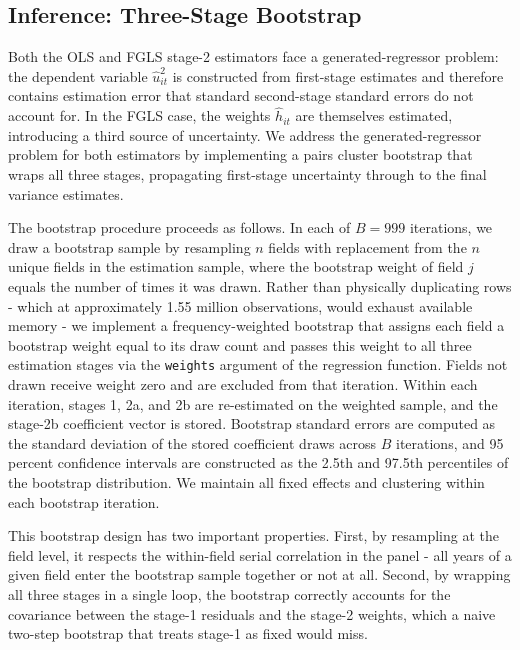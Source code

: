 \documentclass[12pt,letterpaper]{article}
\theoremstyle{remark}
\theoremstyle{remark}
\theoremstyle{plain}
\theoremstyle{definition}
\begin{document}
\subsection{\label{subsec:bootstrap}Inference: Three-Stage Bootstrap}

Both the OLS and FGLS stage-2 estimators face a generated-regressor problem: the dependent variable $\hat{u}_{it}^2$ is constructed from first-stage estimates and therefore contains estimation error that standard second-stage standard errors do not account for. In the FGLS case, the weights $\hat{h}_{it}$ are themselves estimated, introducing a third source of uncertainty. We address the generated-regressor problem for both estimators by implementing a pairs cluster bootstrap that wraps all three stages, propagating first-stage uncertainty through to the final variance estimates.

The bootstrap procedure proceeds as follows. In each of $B = 999$ iterations, we draw a bootstrap sample by resampling $n$ fields with replacement from the $n$ unique fields in the estimation sample, where the bootstrap weight of field $j$ equals the number of times it was drawn. Rather than physically duplicating rows - which at approximately 1.55 million observations, would exhaust available memory - we implement a frequency-weighted bootstrap that assigns each field a bootstrap weight equal to its draw count and passes this weight to all three estimation stages via the \texttt{weights} argument of the regression function. Fields not drawn receive weight zero and are excluded from that iteration. Within each iteration, stages 1, 2a, and 2b are re-estimated on the weighted sample, and the stage-2b coefficient vector is stored. Bootstrap standard errors are computed as the standard deviation of the stored coefficient draws across $B$ iterations, and 95 percent confidence intervals are constructed as the 2.5th and 97.5th percentiles of the bootstrap distribution. We maintain all fixed effects and clustering within each bootstrap iteration.

This bootstrap design has two important properties. First, by resampling at the field level, it respects the within-field serial correlation in the panel - all years of a given field enter the bootstrap sample together or not at all. Second, by wrapping all
three stages in a single loop, the bootstrap correctly accounts for the covariance between the stage-1 residuals and the stage-2 weights, which a naive two-step bootstrap that treats stage-1 as fixed would miss.
\end{document}
